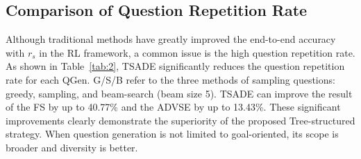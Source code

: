 



\subsection{Comparison of Question Repetition Rate}

Although traditional methods have greatly improved the end-to-end accuracy with $r_s$ in the RL framework, a common issue is the high question repetition rate. 
As shown in Table~\ref{tab:2}, TSADE significantly reduces the question repetition rate for each QGen. 
G/S/B refer to the three methods of sampling questions: greedy, sampling, and beam-search (beam size 5). 
TSADE can improve the result of the FS by up to 40.77\% and the ADVSE by up to 13.43\%. 
These significant improvements clearly demonstrate the superiority of the proposed Tree-structured strategy. 
When question generation is not limited to goal-oriented, its scope is broader and diversity is better.



